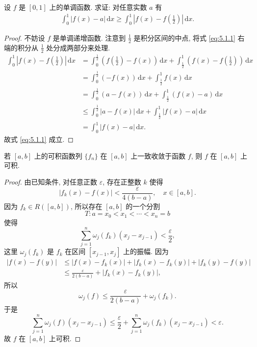 \documentclass[../../main.tex]{subfiles}
\begin{document}
\begin{proposition}\label{proposition:单调函数减任意常数积分小于减其中点的积分}
设 $f$ 是 $[0,1]$ 上的单调函数. 求证: 对任意实数 $a$ 有
\begin{align}\label{eq:5.1.1}
\int_{0}^{1}|f(x)-a|\,\mathrm{d}x\geqslant\int_{0}^{1}\left|f(x)-f\left(\frac{1}{2}\right)\right|\,\mathrm{d}x.
\end{align}
\end{proposition}
\begin{proof}
不妨设 $f$ 是单调递增函数. 注意到 $\frac{1}{2}$ 是积分区间的中点, 将式 \eqref{eq:5.1.1} 右端的积分从 $\frac{1}{2}$ 处分成两部分来处理.
\begin{align*}
\int_{0}^{1}\left|f(x)-f\left(\frac{1}{2}\right)\right|\,\mathrm{d}x&=\int_{0}^{\frac{1}{2}}\left(f\left(\frac{1}{2}\right)-f(x)\right)\,\mathrm{d}x+\int_{\frac{1}{2}}^{1}\left(f(x)-f\left(\frac{1}{2}\right)\right)\,\mathrm{d}x\\
&=\int_{0}^{\frac{1}{2}}(-f(x))\,\mathrm{d}x+\int_{\frac{1}{2}}^{1}f(x)\,\mathrm{d}x\\
&=\int_{0}^{\frac{1}{2}}(a-f(x))\,\mathrm{d}x+\int_{\frac{1}{2}}^{1}(f(x)-a)\,\mathrm{d}x\\
&\leqslant\int_{0}^{\frac{1}{2}}|a-f(x)|\,\mathrm{d}x+\int_{\frac{1}{2}}^{1}|f(x)-a|\,\mathrm{d}x\\
&=\int_{0}^{1}|f(x)-a|\,\mathrm{d}x.
\end{align*}
故式 \eqref{eq:5.1.1} 成立.
\end{proof}

\begin{example}
若 $[a,b]$ 上的可积函数列 $\{f_n\}$ 在 $[a,b]$ 上一致收敛于函数 $f$, 则 $f$ 在 $[a,b]$ 上可积.
\end{example}
\begin{proof}
由已知条件, 对任意正数 $\varepsilon$, 存在正整数 $k$ 使得
$$|f_k(x)-f(x)|<\frac{\varepsilon}{4(b-a)}, \quad x \in[a,b].$$
因为 $f_k \in R([a,b])$, 所以存在 $[a,b]$ 的一个分割
$$T: a=x_0<x_1<\cdots<x_n=b$$
使得
$$\sum_{j=1}^n \omega_j(f_k)(x_j-x_{j-1})<\frac{\varepsilon}{2},$$
这里 $\omega_j(f_k)$ 是 $f_k$ 在区间 $[x_{j-1},x_j]$ 上的振幅. 因为
$$
\begin{aligned}
|f(x)-f(y)| & \leqslant |f(x)-f_k(x)|+\left|f_k(x)-f_k(y)\right|+\left|f_k(y)-f(y)\right| \\
& \leqslant  \frac{\varepsilon}{2(b-a)}+\left|f_k(x)-f_k(y)\right|,
\end{aligned}
$$
所以
$$\omega_j(f) \leqslant  \frac{\varepsilon}{2(b-a)}+\omega_j(f_k).$$
于是
$$\sum_{j=1}^n \omega_j(f)\left(x_j-x_{j-1}\right) \leqslant  \frac{\varepsilon}{2}+\sum_{j=1}^n \omega_j\left(f_k\right)\left(x_j-x_{j-1}\right)<\varepsilon.$$
故 $f$ 在 $[a,b]$ 上可积.
\end{proof}
\end{document}
